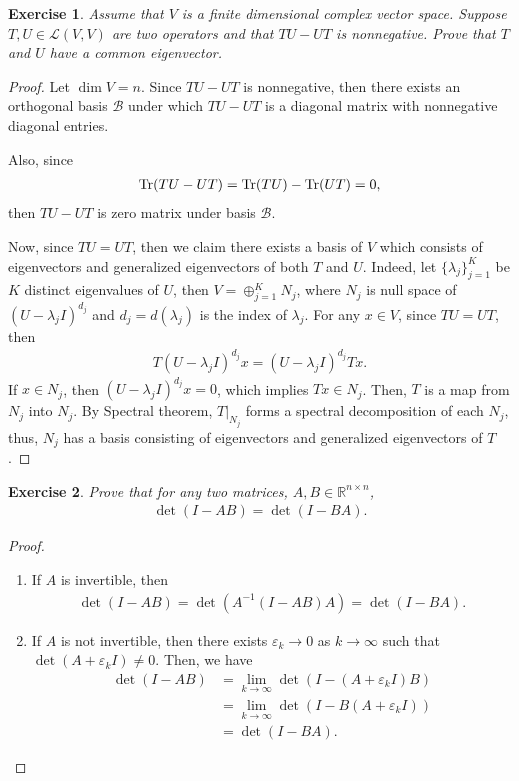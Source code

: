 \documentclass[11pt]{article}
\newtheorem{exercise}{Exercise}[section]
\theoremstyle{definition}
\numberwithin{equation}{subsection}
\begin{document}
\begin{exercise}
Assume that $V$ is a finite dimensional complex vector space. Suppose $T, U \in \mathscr{L}(V, V)$ are two operators and that $TU - UT$ is nonnegative. Prove that $T$ and $U$ have a common eigenvector.
\end{exercise}
\begin{proof}
Let $\dim V = n$. Since $TU - UT$ is nonnegative, then there exists an orthogonal basis $\mathcal{B}$ under which $TU - UT$ is a diagonal matrix with nonnegative diagonal entries. 

Also, since
\begin{align*}
    \Tr (TU - UT) = \Tr(TU) - \Tr(UT) = 0,
\end{align*}
then $TU - UT$ is zero matrix under basis $\mathcal{B}$. 

Now, since $TU = UT$, then we claim there exists a basis of $V$ which consists of eigenvectors and generalized eigenvectors of both $T$ and $U$. Indeed, let $\{\lambda_j \}^K_{j=1}$ be $K$ distinct eigenvalues of $U$, then $V = \oplus^K_{j=1}N_j$, where $N_j$ is null space of $(U - \lambda_j I)^{d_j}$ and $d_j = d(\lambda_j)$ is the index of $\lambda_j$. For any $x \in V$, since $TU = UT$, then 
\begin{align*}
    T (U - \lambda_j I)^{d_j} x = (U - \lambda_j I)^{d_j} T x.
\end{align*}
If $x \in N_j$, then $(U - \lambda_j I)^{d_j} x = 0$, which implies $Tx \in N_j$. Then, $T$ is a map from $N_j$ into $N_j$. By Spectral theorem, $T|_{N_j}$ forms a spectral decomposition of each $N_j$, thus, $N_j$ has a basis consisting of eigenvectors and  generalized eigenvectors of $T$.
\end{proof}

\medskip

\begin{exercise}\label{May_2018_3}
Prove that for any two matrices, $A, B \in \mathbb{R}^{n \times n}$,
\begin{align*}
    \det (I - AB) = \det (I - BA).
\end{align*}
\end{exercise}
\begin{proof}
~\begin{enumerate}[label=(\alph*)]
    \item If $A$ is invertible, then 
    \begin{align*}
        \det (I - AB) = \det \left(A^{-1} (I - AB ) A\right) = \det (I - BA).
    \end{align*}
    
    \item If $A$ is not invertible, then there exists $\varepsilon_k \to 0$ as $k \to \infty$ such that $\det (A + \varepsilon_k I) \neq 0$. Then, we have
    \begin{align*}
        \det (I -  AB) & = \lim_{k\to\infty} \det \left(I - (A + \varepsilon_k I) B\right) \\
        & = \lim_{k\to\infty} \det \left(I - B(A + \varepsilon_k I)\right) \\
        & = \det (I - BA).
    \end{align*}
\end{enumerate}
\end{proof}
\end{document}
